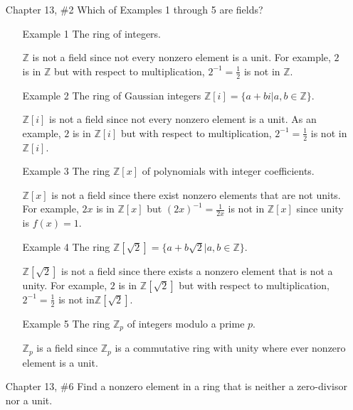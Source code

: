 \documentclass{article}
\newcommand{\Z}{\mathbb Z}
\begin{document}
\begin{enumerate}
    \item[Chapter 13, \#2] Which of Examples 1 through 5 are fields?
    
    \begin{enumerate}
        \item[Example 1] The ring of integers.
        \begin{flushleft}
        $\Z$ is not a field since not every nonzero element is a unit. For example, $2 $ is in $ \Z$ but with respect to multiplication, $2^{-1} = \frac{1}{2} $ is not in $ \Z$.
        \end{flushleft}
        \item[Example 2] The ring of Gaussian integers $\Z[i] = \{a + bi | a, b \in \Z \}$.
        \begin{flushleft}
        $\Z[i]$ is not a field since not every nonzero element is a unit. As an example, $2 $ is in $ \Z[i]$ but with respect to multiplication, $2^{-1} = \frac{1}{2} $ is not in $ \Z[i]$.
        \end{flushleft}
        \item[Example 3] The ring $\Z[x]$ of polynomials with integer coefficients.
        \begin{flushleft}
        $\Z[x]$ is not a field since there exist nonzero elements that are not units. For example, $2x $ is in $ \Z[x]$ but $(2x)^{-1} = \frac{1}{2x} $ is not in $ \Z[x]$ since unity is $f(x) = 1$.
        \end{flushleft}
        \item[Example 4] The ring $\Z[\sqrt{2}] = \{a + b\sqrt{2} | a, b \in \Z \}$.
        \begin{flushleft}
        $\Z[\sqrt{2}]$ is not a field since there exists a nonzero element that is not a unity. For example, $2 $ is in $ \Z[\sqrt{2}]$ but with respect to multiplication, $2^{-1} = \frac{1}{2} $ is not in$ \Z[\sqrt{2}]$.
        \end{flushleft}
        \item[Example 5] The ring $\Z_p$ of integers modulo a prime $p$.
        \begin{flushleft}
        $\Z_p$ is a field since $\Z_p$ is a commutative ring with unity where ever nonzero element is a unit.
        \end{flushleft}
    \end{enumerate}
    
    \item[Chapter 13, \#6] Find a nonzero element in a ring that is neither a zero-divisor nor a unit.
    

\end{enumerate}
\end{document}

